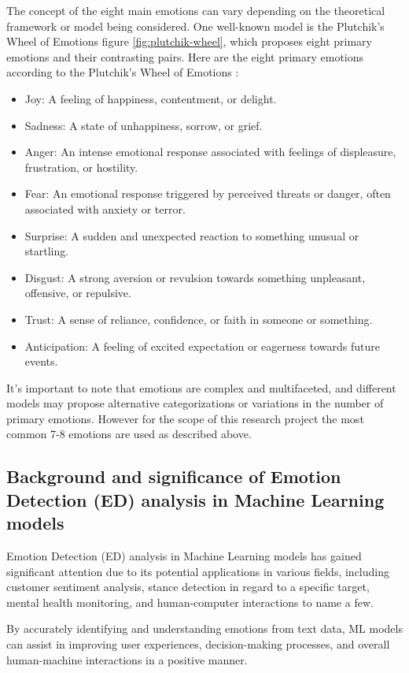 \documentclass[11pt]{article}
\begin{document}
The concept of the eight main emotions can vary depending on the theoretical framework or model being considered. One well-known model is the Plutchik's Wheel of Emotions figure \ref{fig:plutchik-wheel}, which proposes eight primary emotions and their contrasting pairs. Here are the eight primary emotions according to the Plutchik's Wheel of Emotions \cite{Tromp}:

\begin{itemize}
\item Joy: A feeling of happiness, contentment, or delight.
\item Sadness: A state of unhappiness, sorrow, or grief.
\item Anger: An intense emotional response associated with feelings of displeasure, frustration, or hostility.
\item Fear: An emotional response triggered by perceived threats or danger, often associated with anxiety or terror.
\item Surprise: A sudden and unexpected reaction to something unusual or startling.
\item Disgust: A strong aversion or revulsion towards something unpleasant, offensive, or repulsive.
\item Trust: A sense of reliance, confidence, or faith in someone or something.
\item Anticipation: A feeling of excited expectation or eagerness towards future events.
\end{itemize}
It's important to note that emotions are complex and multifaceted, and different models may propose alternative categorizations or variations in the number of primary emotions. However for the scope of this research project the most common 7-8 emotions are used as described above.

\subsection{Background and significance of Emotion Detection (ED) analysis in Machine Learning models}
Emotion Detection (ED) analysis in Machine Learning models has gained significant attention due to its potential applications in various fields, including customer sentiment analysis, stance detection in regard to a specific target\cite{mascarell-etal-2021-stance}, mental health monitoring\cite{Colonnello}, and human-computer interactions to name a few.

By accurately identifying and understanding emotions from text data, ML models can assist in improving user experiences, decision-making processes, and overall human-machine interactions in a positive manner\cite{Colonnello, mascarell-etal-2021-stance}.
\end{document}
